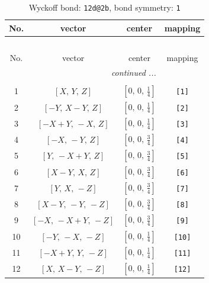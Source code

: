 \documentclass[fleqn,8pt]{jsarticle}
\begin{document}
\begin{longtable}{cccc}
\caption{Wyckoff bond: {\tt 12d@2b}, bond symmetry: {\tt 1}}
 \\
 \hline \hline
No. & vector & center & mapping \\ \hline \endfirsthead

\multicolumn{3}{l}{\tablename\ \thetable{}} \\
 \hline \hline
No. & vector & center & mapping \\ \hline \endhead

 \hline \hline
\multicolumn{3}{r}{\footnotesize\it continued ...} \\ \endfoot

 \hline \hline
\multicolumn{3}{r}{} \\ \endlastfoot

1 & $\left[ X,\, Y,\, Z \right]$ & $\left[ 0,\, 0,\, \frac{1}{4} \right]$ & {\tt [1]} \\ \hline
2 & $\left[ - Y,\, X - Y,\, Z \right]$ & $\left[ 0,\, 0,\, \frac{1}{4} \right]$ & {\tt [2]} \\ \hline
3 & $\left[ - X + Y,\, - X,\, Z \right]$ & $\left[ 0,\, 0,\, \frac{1}{4} \right]$ & {\tt [3]} \\ \hline
4 & $\left[ - X,\, - Y,\, Z \right]$ & $\left[ 0,\, 0,\, \frac{3}{4} \right]$ & {\tt [4]} \\ \hline
5 & $\left[ Y,\, - X + Y,\, Z \right]$ & $\left[ 0,\, 0,\, \frac{3}{4} \right]$ & {\tt [5]} \\ \hline
6 & $\left[ X - Y,\, X,\, Z \right]$ & $\left[ 0,\, 0,\, \frac{3}{4} \right]$ & {\tt [6]} \\ \hline
7 & $\left[ Y,\, X,\, - Z \right]$ & $\left[ 0,\, 0,\, \frac{3}{4} \right]$ & {\tt [7]} \\ \hline
8 & $\left[ X - Y,\, - Y,\, - Z \right]$ & $\left[ 0,\, 0,\, \frac{3}{4} \right]$ & {\tt [8]} \\ \hline
9 & $\left[ - X,\, - X + Y,\, - Z \right]$ & $\left[ 0,\, 0,\, \frac{3}{4} \right]$ & {\tt [9]} \\ \hline
10 & $\left[ - Y,\, - X,\, - Z \right]$ & $\left[ 0,\, 0,\, \frac{1}{4} \right]$ & {\tt [10]} \\ \hline
11 & $\left[ - X + Y,\, Y,\, - Z \right]$ & $\left[ 0,\, 0,\, \frac{1}{4} \right]$ & {\tt [11]} \\ \hline
12 & $\left[ X,\, X - Y,\, - Z \right]$ & $\left[ 0,\, 0,\, \frac{1}{4} \right]$ & {\tt [12]} \\
\end{longtable}
\end{document}
